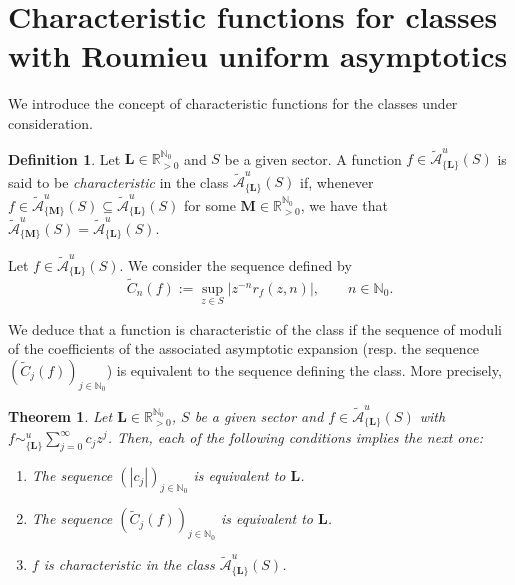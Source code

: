 \documentclass[11pt,a4paper]{article}
\theoremstyle{plain}
\newtheorem{theorem}[proposition]{Theorem}
\theoremstyle{definition}
\newtheorem{definition}[proposition]{Definition}
\newcommand{\RR}{\mathbb{R}}
\newcommand{\NN}{\mathbb{N}}
\newcommand{\M}{\mathbf{M}}
\newcommand{\LL}{\mathbf{L}}
\begin{document}
\section{Characteristic functions for classes with Roumieu uniform asymptotics}\label{sect.CharactFunctions}


We introduce the concept of characteristic functions for the classes under consideration.


\begin{definition}\label{chardef}
	Let $\LL\in\RR_{>0}^{\NN_0}$ and $S$ be a given sector.
A function $f\in \widetilde{\mathcal{A}}^u_{\{\LL\}} (S)$ is said to be \textit{characteristic} in the class $\widetilde{\mathcal{A}}^u_{\{\LL\}} (S)$ if, whenever $f\in \widetilde{\mathcal{A}}^u_{\{\M\}} (S)\subseteq \widetilde{\mathcal{A}}^u_{\{\LL\}} (S)$ for some $\M\in\RR_{>0}^{\NN_0}$, we have that $\widetilde{\mathcal{A}}^u_{\{\M\}} (S)= \widetilde{\mathcal{A}}^u_{\{\LL\}} (S)$.
\end{definition}



Let $f\in \widetilde{\mathcal{A}}^u_{\{\LL\}} (S)$. We consider the sequence defined by
\begin{equation*}%
	\widetilde{C}_n(f):=\sup_{z\in S}|z^{-n}r_f(z,n)|, \qquad n\in\NN_0.
\end{equation*}

We deduce that a function is characteristic of the class if the sequence of moduli of the coefficients of the associated asymptotic expansion (resp. the sequence $(\widetilde{C}_j(f))_{j\in\NN_0}$) is equivalent to the sequence defining the class. More precisely,

\begin{theorem}\label{optthm1}
	Let $\LL\in\RR_{>0}^{\NN_0}$, $S$ be a given sector and $f\in \widetilde{\mathcal{A}}^u_{\{\LL\}} (S)$ with $f\sim^u_{\{\LL\}} \sum_{j=0}^\infty c_j z^j$. Then, each of the following  conditions implies the next one:
	\begin{enumerate}
		\item[$(1)$] The sequence $(|c_j|)_{j\in\NN_0}$ is equivalent to $\LL$.
		\item[$(2)$] The sequence $(\widetilde{C}_j(f))_{j\in\NN_0}$ is equivalent to $\LL$.
		\item[$(3)$] $f$ is characteristic in the class $\widetilde{\mathcal{A}}^u_{\{\LL\}} (S)$.
	\end{enumerate}
\end{theorem}
\end{document}
